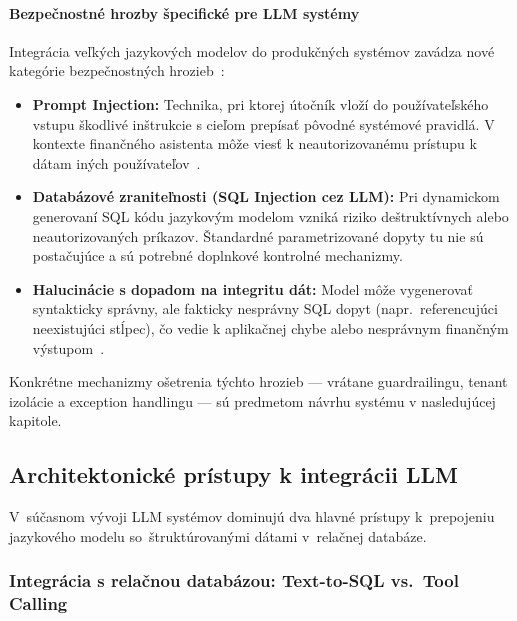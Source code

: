 \paragraph{Bezpečnostné hrozby špecifické pre LLM systémy}

Integrácia veľkých jazykových modelov do produkčných systémov zavádza nové kategórie
bezpečnostných hrozieb~\cite{owasp2025llm, atkinson2025}: %

\begin{itemize}
	\item \textbf{Prompt Injection:} Technika, pri ktorej útočník vloží do používateľského
		vstupu škodlivé inštrukcie s cieľom prepísať pôvodné systémové pravidlá. V
		kontexte finančného asistenta môže viesť k neautorizovanému prístupu k dátam
		iných používateľov~\cite{perez2022prompt, greshake2023indirect}. %

	\item \textbf{Databázové zraniteľnosti (SQL Injection cez LLM):} Pri
		dynamickom generovaní SQL kódu jazykovým modelom vzniká riziko
		deštruktívnych alebo neautorizovaných príkazov. Štandardné parametrizované dopyty
		tu nie sú postačujúce a sú potrebné doplnkové kontrolné mechanizmy.

	\item \textbf{Halucinácie s dopadom na integritu dát:} Model môže vygenerovať
		syntakticky správny, ale fakticky nesprávny SQL dopyt (napr.\ referencujúci neexistujúci
		stĺpec), čo vedie k aplikačnej chybe alebo nesprávnym finančným výstupom~\cite{zhao2023}.
\end{itemize}

Konkrétne mechanizmy ošetrenia týchto hrozieb — vrátane guardrailingu, tenant
izolácie a exception handlingu — sú predmetom návrhu systému v nasledujúcej
kapitole.

\subsection{Architektonické prístupy k integrácii LLM}

V~súčasnom vývoji LLM systémov dominujú dva hlavné prístupy k~prepojeniu jazykového
modelu so~štruktúrovanými dátami v~relačnej databáze.

\subsubsection{Integrácia s relačnou databázou: Text-to-SQL vs.\ Tool Calling}

